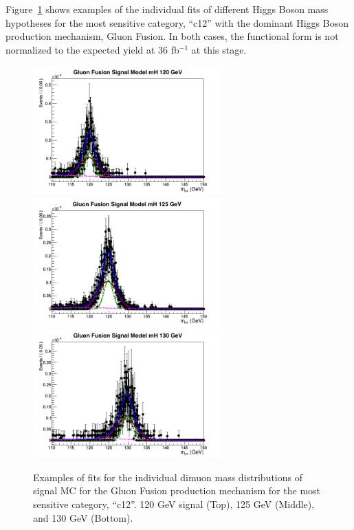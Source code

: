 Figure~\ref{fig:higgs_signalmodel_c12gluglu120125130} shows examples of the individual fits of different Higgs Boson mass hypotheses for the most sensitive category,  ``c12'' with the dominant Higgs Boson production mechanism, Gluon Fusion. In both cases, the functional form is not normalized to the expected yield at 36 fb$^{-1}$ at this stage.
 \begin{figure}[htbp]
     \centering
     \includegraphics[width=0.65\textwidth]{figures/signal_model/AppendixBdt/GluGlu/120/fit_mh_120_GluGlu_cat12.png}\\
     \includegraphics[width=0.65\textwidth]{figures/signal_model/AppendixBdt/GluGlu/125/fit_mh_125_GluGlu_cat12.png}\\
     \includegraphics[width=0.65\textwidth]{figures/signal_model/AppendixBdt/GluGlu/130/fit_mh_130_GluGlu_cat12.png}
     \caption{Examples of fits for the individual dimuon mass distributions of signal MC for the Gluon Fusion production mechanism for the most sensitive category, ``c12''. 120 GeV signal (Top), 125 GeV (Middle), and 130 GeV (Bottom).}
     \label{fig:higgs_signalmodel_c12gluglu120125130}
 \end{figure}

